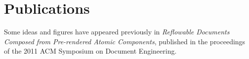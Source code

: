 \chapter*{Publications}
Some ideas and figures have appeared previously in \emph{Reflowable Documents Composed from Pre-rendered Atomic Components}\cite{Pinkney2011}, published in the proceedings of the 2011 ACM Symposium on Document Engineering.